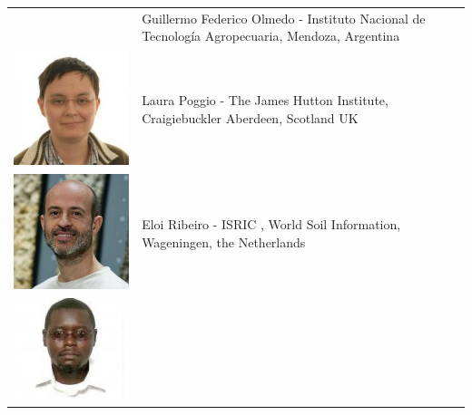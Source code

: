 \documentclass[10pt,b5paper,]{book}
\theoremstyle{definition}
\theoremstyle{definition}
\theoremstyle{definition}
\theoremstyle{remark}
\begin{document}
\begin{longtable}[]{@{}ll@{}}
\begin{minipage}[t]{0.11\columnwidth}
\end{minipage} & \begin{minipage}[t]{0.83\columnwidth}\raggedright
Guillermo Federico Olmedo - Instituto Nacional de Tecnología
Agropecuaria, Mendoza, Argentina\strut
\end{minipage}\tabularnewline
\begin{minipage}[t]{0.11\columnwidth}\raggedright
\includegraphics{contrAuthors/Poggio.jpg}\strut
\end{minipage} & \begin{minipage}[t]{0.83\columnwidth}\raggedright
Laura Poggio - The James Hutton Institute, Craigiebuckler Aberdeen,
Scotland UK\strut
\end{minipage}\tabularnewline
\begin{minipage}[t]{0.11\columnwidth}\raggedright
\includegraphics{contrAuthors/Ribeiro.jpg}\strut
\end{minipage} & \begin{minipage}[t]{0.83\columnwidth}\raggedright
Eloi Ribeiro - ISRIC , World Soil Information, Wageningen, the
Netherlands\strut
\end{minipage}\tabularnewline
\begin{minipage}[t]{0.11\columnwidth}\raggedright
\includegraphics{contrAuthors/Omuto.jpg}\strut

\end{minipage}
\end{longtable}
\end{document}
